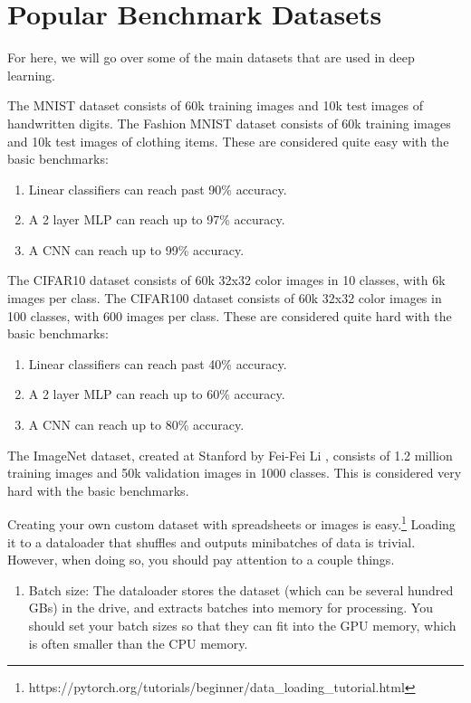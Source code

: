 \section{Popular Benchmark Datasets} 

  For here, we will go over some of the main datasets that are used in deep learning. 

  \begin{definition}
    \label{def:mnist-and-fashion-mnist}
    The MNIST dataset consists of 60k training images and 10k test images of handwritten digits. The Fashion MNIST dataset consists of 60k training images and 10k test images of clothing items. These are considered quite easy with the basic benchmarks: 
    \begin{enumerate} 
      \item Linear classifiers can reach past 90\% accuracy. 
      \item A 2 layer MLP can reach up to 97\% accuracy. 
      \item A CNN can reach up to 99\% accuracy. 
    \end{enumerate}
  \end{definition}

  \begin{definition}
    \label{def:cifar10-and-cifar-100}
    The CIFAR10 dataset consists of 60k 32x32 color images in 10 classes, with 6k images per class. The CIFAR100 dataset consists of 60k 32x32 color images in 100 classes, with 600 images per class. These are considered quite hard with the basic benchmarks: 
    \begin{enumerate} 
      \item Linear classifiers can reach past 40\% accuracy. 
      \item A 2 layer MLP can reach up to 60\% accuracy. 
      \item A CNN can reach up to 80\% accuracy. 
    \end{enumerate}
  \end{definition}

  \begin{definition}[ImageNet]
    \label{def:imagenet}
    The ImageNet dataset, created at Stanford by Fei-Fei Li \cite{ImageNet}, consists of 1.2 million training images and 50k validation images in 1000 classes. This is considered very hard with the basic benchmarks. 
  \end{definition}

  Creating your own custom dataset with spreadsheets or images is easy.\footnote{https://pytorch.org/tutorials/beginner/data\_loading\_tutorial.html} Loading it to a dataloader that shuffles and outputs minibatches of data is trivial. However, when doing so, you should pay attention to a couple things. 
  \begin{enumerate} 
    \item Batch size: The dataloader stores the dataset (which can be several hundred GBs) in the drive, and extracts batches into memory for processing. You should set your batch sizes so that they can fit into the GPU memory, which is often smaller than the CPU memory. 
  \end{enumerate}

